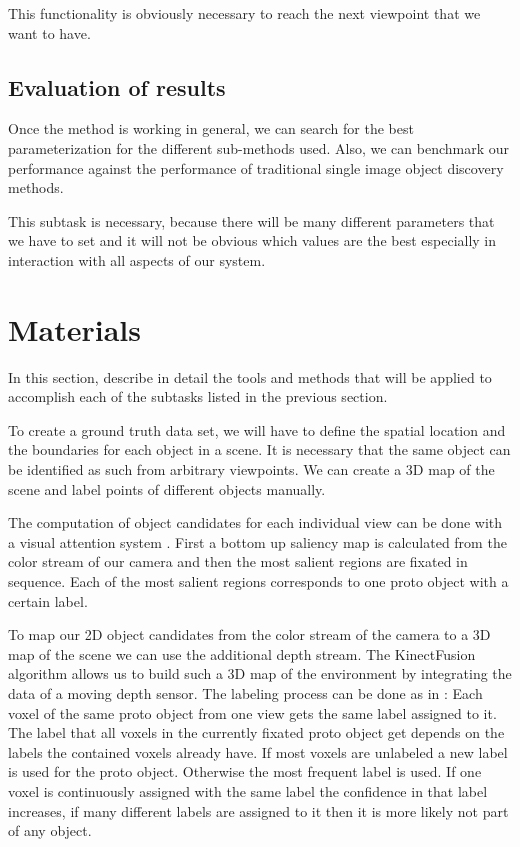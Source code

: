\documentclass[a4paper,11pt,english]{article}
\begin{document}
This functionality is obviously necessary to reach the next viewpoint that we want to have.

\subsection{Evaluation of results}
Once the method is working in general, we can search for the best parameterization for the different sub-methods used.
Also, we can benchmark our performance against the performance of traditional single image object discovery methods.

This subtask is necessary, because there will be many different parameters that we have to set and it will not be obvious which values are the best especially in interaction with all aspects of our system.

\section{Materials}
In this section, describe in detail the tools and methods that will be applied to accomplish each of the subtasks listed in the previous section.\medskip

To create a ground truth data set, we will have to define the spatial location and the boundaries for each object in a scene.
It is necessary that the same object can be identified as such from arbitrary viewpoints.
We can create a 3D map of the scene and label points of different objects manually.

The computation of object candidates for each individual view can be done with a visual attention system \cite{garcia2013computational}.
First a bottom up saliency map is calculated from the color stream of our camera and then the most salient regions are fixated in sequence.
Each of the most salient regions corresponds to one proto object with a certain label.

To map our 2D object candidates from the color stream of the camera to a 3D map of the scene we can use the additional depth stream. The KinectFusion algorithm allows us to build such a 3D map of the environment by integrating the data of a moving depth sensor.
The labeling process can be done as in \cite{garcia2013computational}:
Each voxel of the same proto object from one view gets the same label assigned to it.
The label that all voxels in the currently fixated proto object get depends on the labels the contained voxels already have.
If most voxels are unlabeled a new label is used for the proto object.
Otherwise the most frequent label is used.
If one voxel is continuously assigned with the same label the confidence in that label increases, if many different labels are assigned to it then it is more likely not part of any object.
\end{document}
